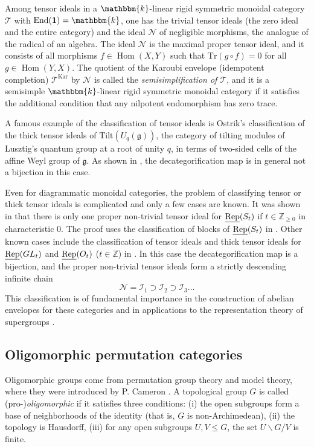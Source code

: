 \documentclass[11pt,a4paper]{amsart}
\theoremstyle{plain}%
\theoremstyle{definition}
\theoremstyle{remark}
\newcommand{\Hom}{\operatorname{Hom}}
\newcommand{\End}{\operatorname{End}}
\newcommand{\uRep}{\underline{{\rm Rep}}}
\newcommand{\kk}{\mathbbm{k}}
\newcommand{\one}{{\mathbf{1}}}
\newcommand{\Kar}{\mathrm{Kar}}
\newcommand{\I}{\mathcal{I}}
\begin{document}
Among tensor ideals in a $\kk$-linear rigid symmetric monoidal category $\mathcal{T}$ with $\End(\one)=\kk$, one has the trivial tensor ideals  (the zero ideal and the entire category) and the ideal $\mathcal{N}$ of negligible morphisms, the analogue of the radical of an algebra. The ideal $\mathcal{N}$ is the maximal proper tensor ideal, and it consists of all morphisms $f \in \Hom(X, Y)$ such that $\mathrm{Tr}(g \circ f) = 0$ for all $g \in \Hom(Y, X)$. The quotient of the Karoubi envelope (idempotent completion) $\mathcal{T}^{\Kar}$ by $\mathcal{N}$ is called the \emph{semisimplification of $\mathcal{T}$}, and it is a semisimple $\kk$-linear rigid symmetric monoidal category if it satisfies the additional condition that any nilpotent endomorphism has zero trace.

A famous example of the classification of tensor ideals is Ostrik's classification \cite{Ostrik} of the thick tensor ideals of $\mathrm{Tilt}(U_q(\mathfrak{g}))$, the category of tilting modules of {Lusztig}'s quantum group at a root of unity $q$, in terms of two-sided cells of the affine Weyl group of $\mathfrak{g}$. As shown in \cite{Coulembier-ideals}, the decategorification map is in general not a bijection in this case.

Even for diagrammatic monoidal categories, the problem of classifying tensor or thick tensor ideals is complicated and only a few cases are known. It was shown in \cite{CO-abelian} that there is only one proper non-trivial tensor ideal for $\uRep(S_t)$ if $t\in \mathbb{Z}_{\geq 0}$ in characteristic $0$. The proof uses the classification of blocks of $\uRep(S_t)$ in \cite{CO-blocks}. Other known cases include the classification of tensor ideals and thick tensor ideals for $\uRep(GL_t)$ and $\uRep(O_t)$ ($t \in \mathbb{Z}$) in \cite{Comes}\cite{Comes-Heidersdorf,Coulembier-ideals}. In this case the decategorification map is a bijection, and the proper non-trivial tensor ideals form a strictly descending infinite chain \[ \mathcal{N} = \mathcal{I}_1 \supset \I_2 \supset {\I_3} \ldots \] This classification is of fundamental importance in the construction of abelian envelopes for these categories \cite{EHS, Coulembier-abelian} and in applications to the representation theory of supergroups \cite{heidersdorf2017mixed}.



\subsection{Oligomorphic permutation categories} 
Oligomorphic groups come from permutation group theory and model theory, where they were introduced by P. Cameron \cite{Cameron-orbits}. A topological group $G$ is called (pro-)\emph{oligomorphic} if it satisfies three conditions: (i) the open subgroups form a base of {neighborhoods} of the identity (that is, $G$ is non-Archimedean), (ii) the topology is Hausdorff, (iii) for any open subgroups $U, V\leq G$, the set $U\backslash G/V$ is finite.
\end{document}
